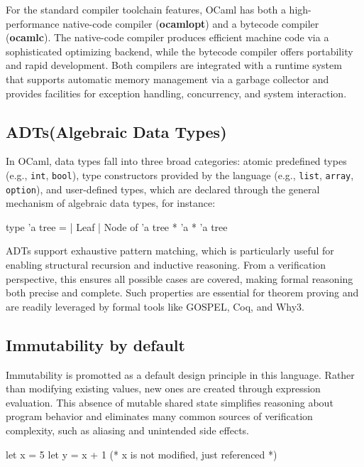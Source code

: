 For the standard compiler toolchain features, OCaml has both a high-performance native-code compiler (\textbf{ocamlopt}) and a 
bytecode compiler (\textbf{ocamlc}). The native-code compiler produces efficient machine code via a sophisticated optimizing 
backend, while the bytecode compiler offers portability and rapid development. Both compilers are integrated with a runtime 
system that supports automatic memory management via a garbage collector and provides facilities for exception handling, 
concurrency, and system interaction.

\subsection{ADTs(Algebraic Data Types)}

In OCaml, data types fall into three broad categories: atomic predefined types (e.g., \texttt{int}, \texttt{bool}), type 
constructors provided by the language (e.g., \texttt{list}, \texttt{array}, \texttt{option}), and user-defined types, which 
are declared through the general mechanism of algebraic data types, for instance:

\begin{ocamlenv}
  type 'a tree =
    | Leaf
    | Node of 'a tree * 'a * 'a tree
\end{ocamlenv}

ADTs support exhaustive pattern matching, which is particularly useful for enabling structural recursion and inductive reasoning.
From a verification perspective, this ensures all possible cases are covered, making formal reasoning both precise and complete. 
Such properties are essential for theorem proving and are readily leveraged by formal tools like GOSPEL, Coq, and Why3.

\subsection{Immutability by default}

Immutability is promotted as a default design principle in this language. Rather than modifying existing values, new ones 
are created through expression evaluation. This absence of mutable shared state simplifies reasoning about program behavior 
and eliminates many common sources of verification complexity, such as aliasing and unintended side effects.

\begin{ocamlenv}
  let x = 5
  let y = x + 1 (* x is not modified, just referenced *)
\end{ocamlenv}

